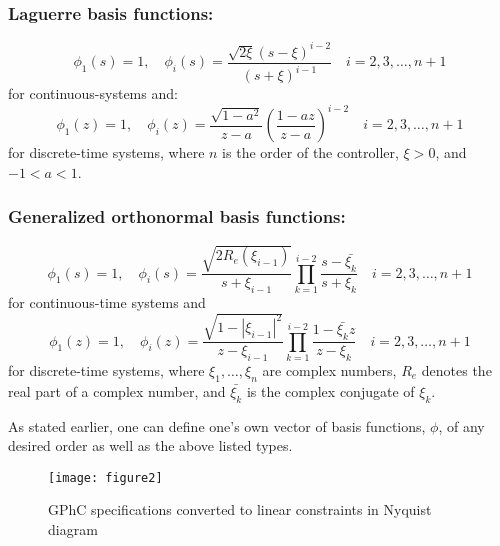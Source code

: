 \documentclass [12pt , a4paper] {report}
\begin{document}
\subsubsection{Laguerre basis functions:}

\begin{equation}
\phi_1(s)=1, \quad \phi_i(s)=\frac{\sqrt{2\xi}(s-\xi)^{i-2}}{(s+\xi)^{i-1}} \quad   i=2,3,\ldots,n+1 
\end{equation}
for continuous-systems and:
\begin{equation}
\phi_1(z)=1, \quad \phi_i(z)=\frac{\sqrt{1-a^2}}{z-a} \left(\frac{1-az}{z-a}\right)^{i-2} \quad   i=2,3,\ldots,n+1 
\end{equation}
for discrete-time systems, where $n$ is the order of the controller, $\xi>0$, and $-1<a<1$.

\subsubsection{Generalized orthonormal basis functions:}

\begin{equation}
\phi_1(s)=1, \quad \phi_i(s)=\frac{\sqrt{2R_e(\xi_{i-1})}}{s+\xi_{i-1}} \prod_{k=1}^{i-2}\frac{s-\bar{\xi_k}}{s+\xi_k} \quad  i=2,3,\ldots,n+1 
\end{equation}
for continuous-time systems and
\begin{equation}
\phi_1(z)=1, \quad \phi_i(z)=\frac{\sqrt{1-|\xi_{i-1}|^2}}{z-\xi_{i-1}} \prod_{k=1}^{i-2}\frac{1-\bar{\xi_k}z}{z-\xi_k} \quad  i=2,3,\ldots,n+1 
\end{equation}
for discrete-time systems,
where $\xi_1, \ldots, \xi_n$ are complex numbers, $R_e$ denotes the real part of a complex number, and $\bar{\xi_k}$ is the complex conjugate of $\xi_k$.


As stated earlier, one can define one's own vector of basis functions, $\phi$, of any desired order as well as the above listed types.

\begin{figure}
\centering
{}
\texttt{[image: figure2]}
\caption{GPhC specifications converted to linear constraints in Nyquist diagram}
\label{fig:GPhC}
\end{figure}
\end{document}
